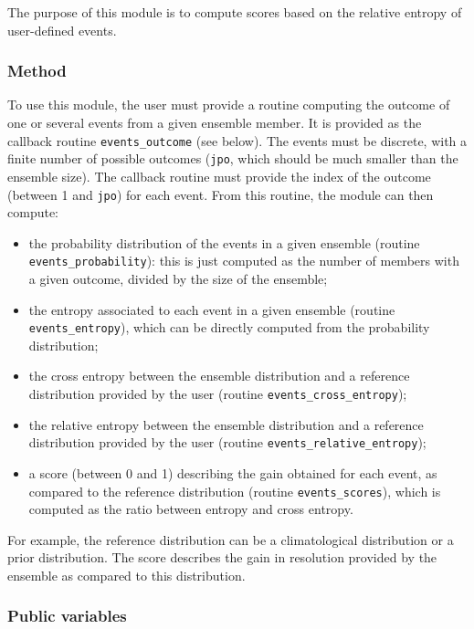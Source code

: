 \documentclass[11pt]{article}
\begin{document}
The purpose of this module is to compute
scores based on the relative entropy of user-defined events.

\subsubsection*{Method}

To use this module, the user must provide a routine
computing the outcome of one or several events from a given ensemble member.
It is provided as the callback routine {\tt events\_outcome} (see below).
The events must be discrete, with a finite number of possible outcomes
({\tt jpo}, which should be much smaller than the ensemble size).
The callback routine must provide the index of the outcome (between 1 and {\tt jpo}) for each event.
From this routine, the module can then compute:

\begin{itemize}
\item the probability distribution of the events in a given ensemble (routine {\tt events\_probability}):
this is just computed as the number of members with a given outcome, divided by the size of the ensemble;
\item the entropy associated to each event in a given ensemble (routine {\tt events\_entropy}),
which can be directly computed from the probability distribution;
\item the cross entropy between the ensemble distribution and a reference distribution
provided by the user (routine {\tt events\_cross\_entropy});
\item the relative entropy between the ensemble distribution and a reference distribution
provided by the user (routine {\tt events\_relative\_entropy});
\item a score (between 0 and 1) describing the gain obtained for each event,
as compared to the reference distribution (routine {\tt events\_scores}),
which is computed as the ratio between entropy and cross entropy.
\end{itemize}

\noindent
For example, the reference distribution can be a climatological distribution or a prior distribution.
The score describes the gain in resolution provided by the ensemble as compared to this distribution.

\subsubsection*{Public variables}
\end{document}
